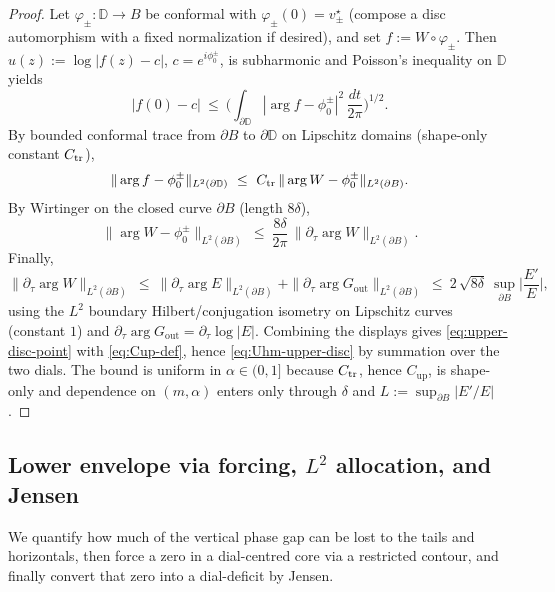 \documentclass[11pt]{article}
\numberwithin{equation}{section}
\theoremstyle{remark}
\newcommand{\D}{\mathbb{D}}
\newcommand{\Gout}{G_{\mathrm{out}}}
\begin{document}
\begin{proof}
Let $\varphi_\pm:\D\to B$ be conformal with $\varphi_\pm(0)=v_\pm^\star$ (compose a disc automorphism with a fixed normalization if desired), and set $f:=W\circ\varphi_\pm$. %
Then $u(z):=\log|f(z)-c|$, $c=e^{i\phi_0^\pm}$, is subharmonic and Poisson’s inequality on $\D$ yields
\[
|f(0)-c|\ \le\ \Big(\int_{\partial\D}|\arg f-\phi_0^\pm|^2\,\frac{dt}{2\pi}\Big)^{1/2}.
\]
By bounded conformal trace from $\partial B$ to $\partial\D$ on Lipschitz domains (shape-only constant $C_{\rm tr}$),
\[
\|\arg f-\phi_0^\pm\|_{L^2(\partial\D)}\ \le\ C_{\rm tr}\,\|\arg W-\phi_0^\pm\|_{L^2(\partial B)}.
\]
By Wirtinger on the closed curve $\partial B$ (length $8\delta$),
\[
\|\arg W-\phi_0^\pm\|_{L^2(\partial B)}\ \le\ \frac{8\delta}{2\pi}\,\|\partial_\tau\arg W\|_{L^2(\partial B)}.
\]
Finally,
\[
\|\partial_\tau\arg W\|_{L^2(\partial B)}\ \le\ \|\partial_\tau\arg E\|_{L^2(\partial B)}+\|\partial_\tau\arg \Gout\|_{L^2(\partial B)}
\ \le\ 2\,\sqrt{8\delta}\ \sup_{\partial B}\Big|\frac{E'}{E}\Big|,
\]
using the $L^2$ boundary Hilbert/conjugation isometry on Lipschitz curves (constant $1$) and $\partial_\tau\arg \Gout=\partial_\tau\log|E|$. Combining the displays gives \eqref{eq:upper-disc-point} with \eqref{eq:Cup-def}, hence \eqref{eq:Uhm-upper-disc} by summation over the two dials. The bound is uniform in $\alpha\in(0,1]$ because $C_{\rm tr}$, hence $C_{\mathrm{up}}$, is shape-only and dependence on $(m,\alpha)$ enters only through $\delta$ and $L:=\sup_{\partial B}|E'/E|$.
\end{proof}

\subsection{Lower envelope via forcing, $L^2$ allocation, and Jensen}\label{subsec:lower-new}

We quantify how much of the vertical phase gap can be lost to the tails and horizontals, then force a zero in a dial-centred core via a restricted contour, and finally convert that zero into a dial-deficit by Jensen.
\end{document}
